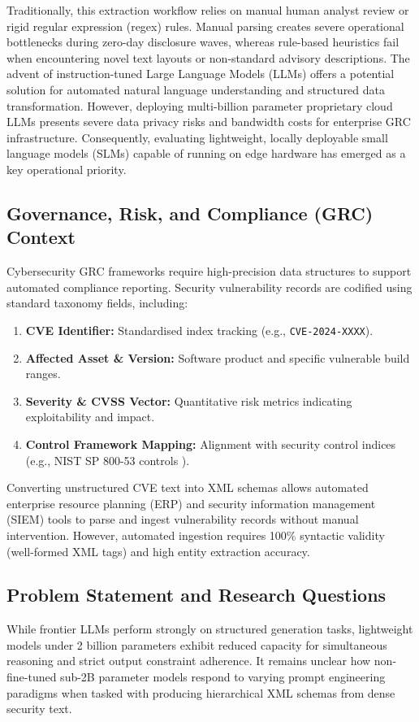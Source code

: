 \documentclass[11pt,a4paper]{article}
\begin{document}
Traditionally, this extraction workflow relies on manual human analyst review or rigid regular expression (regex) rules. Manual parsing creates severe operational bottlenecks during zero-day disclosure waves, whereas rule-based heuristics fail when encountering novel text layouts or non-standard advisory descriptions. The advent of instruction-tuned Large Language Models (LLMs) offers a potential solution for automated natural language understanding and structured data transformation. However, deploying multi-billion parameter proprietary cloud LLMs presents severe data privacy risks and bandwidth costs for enterprise GRC infrastructure. Consequently, evaluating lightweight, locally deployable small language models (SLMs) capable of running on edge hardware has emerged as a key operational priority.

\subsection{Governance, Risk, and Compliance (GRC) Context}
Cybersecurity GRC frameworks require high-precision data structures to support automated compliance reporting. Security vulnerability records are codified using standard taxonomy fields, including:
\begin{enumerate}
    \item \textbf{CVE Identifier:} Standardised index tracking (e.g., \texttt{CVE-2024-XXXX}).
    \item \textbf{Affected Asset \& Version:} Software product and specific vulnerable build ranges.
    \item \textbf{Severity \& CVSS Vector:} Quantitative risk metrics indicating exploitability and impact.
    \item \textbf{Control Framework Mapping:} Alignment with security control indices (e.g., NIST SP 800-53 controls \cite{nist80053}).
\end{enumerate}

Converting unstructured CVE text into XML schemas allows automated enterprise resource planning (ERP) and security information management (SIEM) tools to parse and ingest vulnerability records without manual intervention. However, automated ingestion requires 100\% syntactic validity (well-formed XML tags) and high entity extraction accuracy.

\subsection{Problem Statement and Research Questions}
While frontier LLMs perform strongly on structured generation tasks, lightweight models under 2 billion parameters exhibit reduced capacity for simultaneous reasoning and strict output constraint adherence. It remains unclear how non-fine-tuned sub-2B parameter models respond to varying prompt engineering paradigms when tasked with producing hierarchical XML schemas from dense security text.
\end{document}

